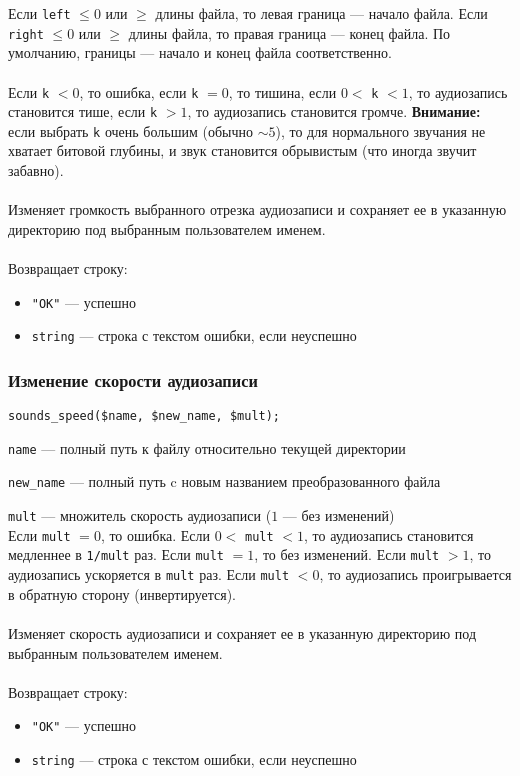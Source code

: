\documentclass[14pt,a4paper]{article}
\begin{document}
\noindent Если \lstinline{left} $\leq 0$ или $\geq$ длины файла, то левая граница --- начало файла. Если \lstinline{right} $\leq 0$ или $\geq$ длины файла, то правая граница --- конец файла. По умолчанию, границы --- начало и конец файла соответственно. \\\\
Если \lstinline{k} $< 0$, то ошибка, если \lstinline{k} $= 0$, то тишина, если $0 <$ \lstinline{k} $< 1$, то аудиозапись становится тише, если \lstinline{k} $> 1$, то аудиозапись становится громче. \textbf{Внимание:} если выбрать \lstinline{k} очень большим (обычно $\sim 5$), то для нормального звучания не хватает битовой глубины, и звук становится обрывистым (что иногда звучит забавно).\\\\
Изменяет громкость выбранного отрезка аудиозаписи и сохраняет ее в указанную директорию под выбранным пользователем именем. \\\\
Возвращает строку:
\smallskip
\begin{itemize}
\item \lstinline{"OK"} --- успешно
\item \lstinline{string} --- строка с текстом ошибки, если неуспешно
\end{itemize}

\subsubsection*{Изменение скорости аудиозаписи}

\begin{lstlisting}
sounds_speed($name, $new_name, $mult);
\end{lstlisting}

\lstinline{name} --- полный путь к файлу относительно текущей директории \par
\lstinline{new_name} --- полный путь c новым названием преобразованного файла \par
\lstinline{mult} --- множитель скорость аудиозаписи ($1$ --- без изменений) \\

\noindent Если \lstinline{mult} $= 0$, то ошибка. Если $0 <$ \lstinline{mult} $< 1$, то аудиозапись становится медленнее в \lstinline{1/mult} раз. Если \lstinline{mult} $= 1$, то без изменений. Если \lstinline{mult} $> 1$, то аудиозапись ускоряется в \lstinline{mult} раз. Если \lstinline{mult} $< 0$, то аудиозапись проигрывается в обратную сторону (инвертируется).\\\\
Изменяет скорость аудиозаписи и сохраняет ее в указанную директорию под выбранным пользователем именем. \\\\
Возвращает строку:
\smallskip
\begin{itemize}
\item \lstinline{"OK"} --- успешно
\item \lstinline{string} --- строка с текстом ошибки, если неуспешно
\end{itemize}
\end{document}
